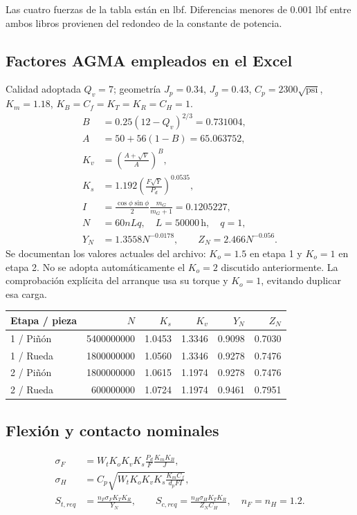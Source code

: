 \documentclass[11pt,a4paper]{article}
\begin{document}
Las cuatro fuerzas de la tabla están en lbf. Diferencias menores de 0.001 lbf entre ambos libros provienen del redondeo de la constante de potencia.

\subsection{Factores AGMA empleados en el Excel}
Calidad adoptada $Q_v=7$; geometría $J_p=0.34$, $J_g=0.43$, $C_p=2300\sqrt{\mathrm{psi}}$, $K_m=1.18$, $K_B=C_f=K_T=K_R=C_H=1$.
\begin{align*}
B&=0.25(12-Q_v)^{2/3}=0.731004,\\
A&=50+56(1-B)=65.063752,\\
K_v&=\left(\frac{A+\sqrt V}{A}\right)^B,\\
K_s&=1.192\left(\frac{F\sqrt Y}{P_d}\right)^{0.0535},\\
I&=\frac{\cos\phi\sin\phi}{2}\frac{m_G}{m_G+1}=0.1205227,\\
N&=60nLq,\quad L=50000\,\mathrm{h},\quad q=1,\\
Y_N&=1.3558N^{-0.0178},\qquad Z_N=2.466N^{-0.056}.
\end{align*}
Se documentan los valores actuales del archivo: $K_o=1.5$ en etapa 1 y $K_o=1$ en etapa 2. No se adopta automáticamente el $K_o=2$ discutido anteriormente. La comprobación explícita del arranque usa su torque y $K_o=1$, evitando duplicar esa carga.

\begin{center}\small\begin{tabular}{lrrrrr}\toprule

Etapa / pieza & $N$ & $K_s$ & $K_v$ & $Y_N$ & $Z_N$ \\ \midrule

1 / Piñón & 5400000000 & 1.0453 & 1.3346 & 0.9098 & 0.7030 \\

1 / Rueda & 1800000000 & 1.0560 & 1.3346 & 0.9278 & 0.7476 \\

2 / Piñón & 1800000000 & 1.0615 & 1.1974 & 0.9278 & 0.7476 \\

2 / Rueda & 600000000 & 1.0724 & 1.1974 & 0.9461 & 0.7951 \\

\bottomrule\end{tabular}\end{center}

\subsection{Flexión y contacto nominales}
\begin{align*}
\sigma_F&=W_tK_oK_vK_s\frac{P_d}{F}\frac{K_mK_B}{J},\\
\sigma_H&=C_p\sqrt{W_tK_oK_vK_s\frac{K_mC_f}{d_pFI}},\\
S_{t,req}&=\frac{n_F\sigma_FK_TK_R}{Y_N},\qquad
S_{c,req}=\frac{n_H\sigma_HK_TK_R}{Z_NC_H},\quad n_F=n_H=1.2.
\end{align*}
\end{document}
